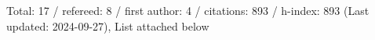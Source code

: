 Total: 17 / refereed: 8 / first author: 4 / citations: 893 / h-index: 893 (Last updated: 2024-09-27), List attached below